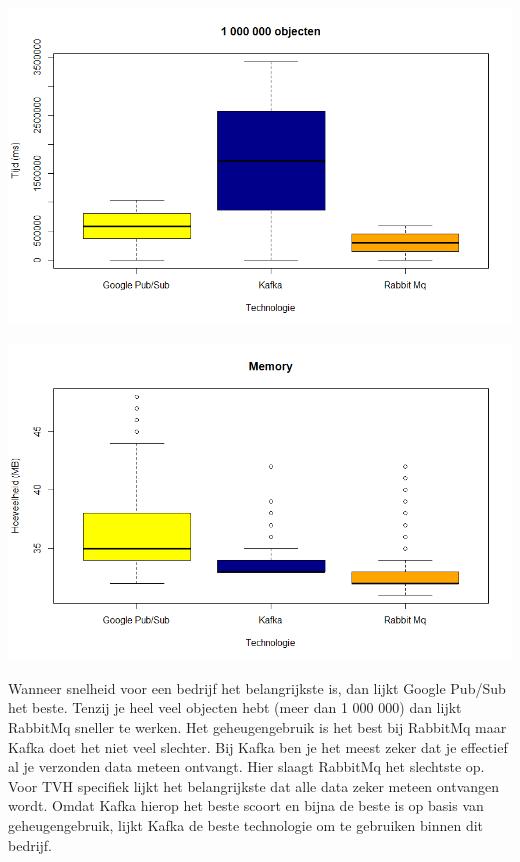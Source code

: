 \documentclass[a0,portrait]{a0poster}
\begin{document}
\begin{multicols}{2}
\begin{center}
    \includegraphics[width=200mm]{1000000Boxplot}
\end{center}\vspace{1cm}

\begin{center}\vspace{1cm}
    \includegraphics[width=200mm]{memory}
\end{center}\vspace{1cm}
Wanneer snelheid voor een bedrijf het belangrijkste is, dan lijkt Google Pub/Sub het beste. Tenzij je heel veel objecten hebt (meer dan 1 000 000) dan lijkt RabbitMq sneller te werken. Het geheugengebruik is het best bij RabbitMq maar Kafka doet het niet veel slechter. Bij Kafka ben je het meest zeker dat je effectief al je verzonden data meteen ontvangt. Hier slaagt RabbitMq het slechtste op.
Voor TVH specifiek lijkt het belangrijkste dat alle data zeker meteen ontvangen wordt. Omdat Kafka hierop het beste scoort en bijna de beste is op basis van geheugengebruik, lijkt Kafka de beste technologie om te gebruiken binnen dit bedrijf.
\color{HoGentAccent1} 

\end{multicols}
\end{document}

